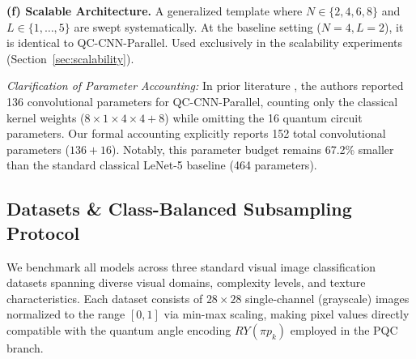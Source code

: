 \documentclass[journal]{IEEEtran}
\begin{document}
\textbf{(f) Scalable Architecture.} A generalized template where $N \in \{2, 4, 6, 8\}$ and $L \in \{1, \dots, 5\}$ are swept systematically. At the baseline setting ($N=4, L=2$), it is identical to QC-CNN-Parallel. Used exclusively in the scalability experiments (Section~\ref{sec:scalability}).

\begin{table}[!htbp]
\centering
\caption{Comprehensive Parameter Accounting and Architectural Specifications Across the Extended Model Suite}
\label{tab:param_accounting}
\renewcommand{\arraystretch}{1.2}
\end{table}

\textit{Clarification of Parameter Accounting:} In prior literature \cite{liu2026parallel}, the authors reported 136 convolutional parameters for QC-CNN-Parallel, counting only the classical kernel weights ($8 \times 1 \times 4 \times 4 + 8$) while omitting the 16 quantum circuit parameters. Our formal accounting explicitly reports 152 total convolutional parameters ($136 + 16$). Notably, this parameter budget remains 67.2\% smaller than the standard classical LeNet-5 baseline (464 parameters).

\subsection{Datasets \& Class-Balanced Subsampling Protocol}
We benchmark all models across three standard visual image classification datasets spanning diverse visual domains, complexity levels, and texture characteristics. Each dataset consists of $28 \times 28$ single-channel (grayscale) images normalized to the range $[0, 1]$ via min-max scaling, making pixel values directly compatible with the quantum angle encoding $RY(\pi p_k)$ employed in the PQC branch.
\end{document}
